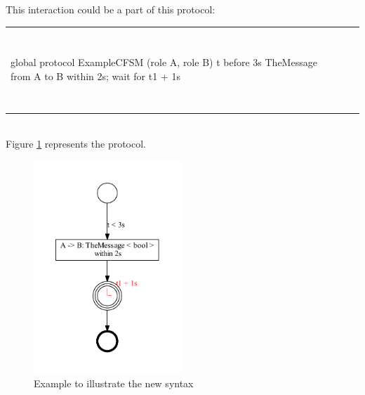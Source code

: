 \documentclass[a4paper,11pt,twoside]{report}
\begin{document}
This interaction could be a part of this protocol:\\
\begin{tabular}{ll}
~&~\\
\begin{SJLISTING}
global protocol ExampleCFSM (role A, role B){
	t before 3s
	TheMessage from A to B within 2s;
	wait for t1 + 1s
}
\end{SJLISTING}
&\\
~&~\\
\end{tabular}\\
Figure \ref{fig:excfsm} represents the protocol.

\begin{figure}[h]
\begin{center}
\includegraphics[height=8cm]{ExampleCFSM}\caption{Example to illustrate the new syntax}\label{fig:excfsm}
\end{center}
\end{figure}
\end{document}

